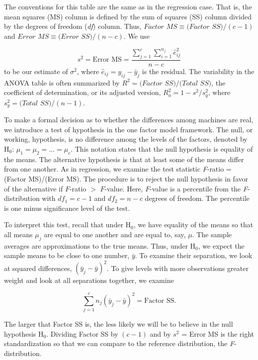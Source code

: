 The conventions for this table are the same as in the regression case. That
is, the mean squares (MS) column is defined by the sum of squares (SS)
column divided by the degrees of freedom (\textit{df}) column. Thus, $Factor$
$MS\equiv (Factor$ $SS)/(c-1)$ and $Error$ $MS\equiv (Error$ $SS)/(n-c)$. We
use

\begin{equation*}
s^{2}=\text{Error MS}=\frac{\sum_{j=1}^{c}\sum_{i=1}^{n_{j}}\hat{e}_{ij}^{2}%
}{n-c}
\end{equation*}%
to be our estimate of $\sigma ^{2}$, where $\hat{e}_{ij}=y_{ij}-\bar{y}_{j}$
is the residual. The variability in the ANOVA table is often summarized by $%
R^{2}=(Factor$ $SS)/(Total$ $SS)$, the coefficient of determination, or its
adjusted version, $R_{a}^{2}=1-s^{2}/s_{y}^{2}$, where $s_{y}^{2}=(Total$ $%
SS)/(n-1)$.


To make a formal decision as to whether the differences among
machines are real, we introduce a test of hypothesis in the one
factor model framework. The null, or working, hypothesis, is no
difference among the levels of the factors, denoted by H$_{0}$: $\mu
_{1}=\mu _{2}=\ldots =\mu _{c}$. This notation states that the null
hypothesis is equality of the means. The alternative hypothesis is
that at least some of the means differ from one another. As in
regression, we examine the test statistic \textit{F}-ratio = (Factor
MS)/(Error MS). The procedure is to reject the null hypothesis in
favor of the alternative if $F$-ratio $>$ $F$-value. Here, $F$-value
is a percentile from the \textit{F}-distribution with $df_{1}=c-1$
and $df_{2}=n-c$ degrees of freedom. The percentile is one minus
significance level of the test.

To interpret this test, recall that under H$_{0}$, we have equality of the
means so that all means $\mu _{j}$ are equal to one another and are equal
to, say, $\mu $. The sample averages are approximations to the true means.
Thus, under H$_{0}$, we expect the sample means to be close to one number, $%
\bar{y}$. To examine their separation, we look at squared differences, $(%
\bar{y}_{j}-\bar{y})^{2}$. To give levels with more observations greater
weight and look at all separations together, we examine

\begin{equation*}
\sum_{j=1}^{c}n_{j}(\bar{y}_{j}-\bar{y})^{2}=\text{Factor SS}.
\end{equation*}

The larger that Factor SS is, the less likely we will be to believe in the
null hypothesis H$_{0}$. Dividing Factor SS by $(c-1)$ and by $s^{2}$ =
Error MS is the right standardization so that we can compare to the
reference distribution, the \textit{F}-distribution.


